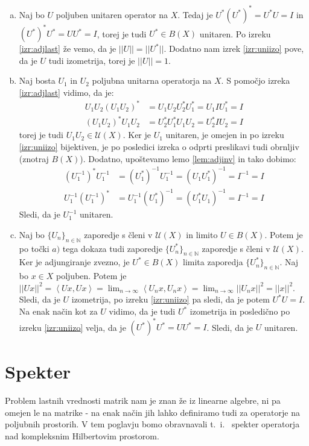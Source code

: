 \documentclass[mat2]{matdelo}
\newcommand{\N}{\mathbb{N}}
\newcommand{\abs}[1]{\ensuremath{\lvert #1 \rvert}}
\newcommand{\norm}[1]{\abs{\abs{#1}}}
\newcommand{\Sp}[2]{\ensuremath{\left<#1, #2\right>}}
\begin{document}
			\begin{dokaz}
				\begin{enumerate}[a)]
					\item Naj bo $U$ poljuben unitaren operator na $X$. Tedaj je $U^*(U^*)^* = U^*U = I$ in $(U^*)^*U^* = UU^* = I$, torej je tudi $U^*\in B(X)$ unitaren. Po izreku \ref{izr:adjlast} že vemo, da je $\norm{U} = \norm{U^*}$. Dodatno nam izrek \ref{izr:uniizo} pove, da je $U$ tudi izometrija, torej je $\norm{U} = 1$.
					\item Naj bosta $U_1$ in $U_2$ poljubna unitarna operatorja na $X$. S pomočjo izreka \ref{izr:adjlast} vidimo, da je: \begin{align*}
						U_1U_2(U_1U_2)^* &= U_1U_2U_2^*U_1^* = U_1IU_1^* = I \\
						(U_1U_2)^*U_1U_2 &= U_2^*U_1^*U_1U_2 = U_2^*IU_2 = I 
					\end{align*} torej je tudi $U_1U_2 \in \mathcal{U}(X)$.
					Ker je $U_1$ unitaren, je omejen in po izreku \ref{izr:uniizo} bijektiven, je po posledici izreka o odprti preslikavi tudi obrnljiv (znotraj $B(X)$). Dodatno, upoštevamo lemo \ref{lem:adjinv} in tako dobimo: \begin{align*}
						(U_1^{-1})^*U_1^{-1} &= (U_1^*)^{-1}U_1^{-1} = (U_1U_1^*)^{-1} = I^{-1} = I \\
						U_1^{-1}(U_1^{-1})^* &= U_1^{-1}(U_1^*)^{-1} = (U_1^*U_1)^{-1} = I^{-1} = I
					\end{align*}
					Sledi, da je $U_1^{-1}$ unitaren.
					\item Naj bo $\{U_n\}_{n\in\N}$ zaporedje s členi v $\mathcal{U}(X)$ in limito $U \in B(X)$. Potem je po točki $a)$ tega dokaza tudi zaporedje $\{U_n^*\}_{n\in\N}$ zaporedje s členi v $\mathcal{U}(X)$. Ker je adjungiranje zvezno, je $U^*\in B(X)$ limita zaporedja $\{U_n^*\}_{n\in\N}$. Naj bo $x\in X$ poljuben. Potem je $\norm{Ux}^2 = \Sp{Ux}{Ux} = \lim_{n\to\infty}\Sp{U_nx}{U_nx} = \lim_{n\to\infty}\norm{U_nx}^2 = \norm{x}^2$. Sledi, da je $U$ izometrija, po izreku \ref{izr:uniizo} pa sledi, da je potem $U^*U = I$. Na enak način kot za $U$ vidimo, da je tudi $U^*$ izometrija in posledično po izreku \ref{izr:uniizo} velja, da je $(U^*)^*U^* = UU^* = I$. Sledi, da je $U$ unitaren.
				\end{enumerate}
			\end{dokaz}
	\section{Spekter}
		Problem lastnih vrednosti matrik nam je znan že iz linearne algebre, ni pa omejen le na matrike - na enak način jih lahko definiramo tudi za operatorje na poljubnih prostorih. V tem poglavju bomo obravnavali t.~i.~ spekter operatorja nad kompleksnim Hilbertovim prostorom.
		
\end{document}
